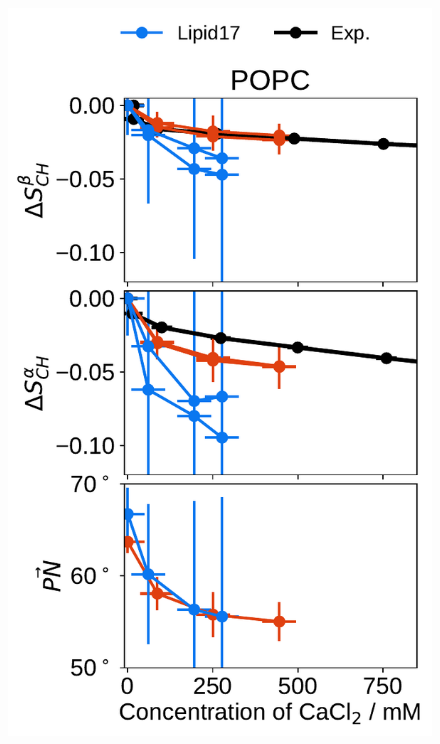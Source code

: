 \begin{figure}[tbp!] 
  \centering 
  \includegraphics[width=\figwidthsmall]{../img/ecc_pops/order_parameters_changes_ecc-lip_L14_A-B-PN-COO_POPC_cacl.pdf} 

\end{figure}
